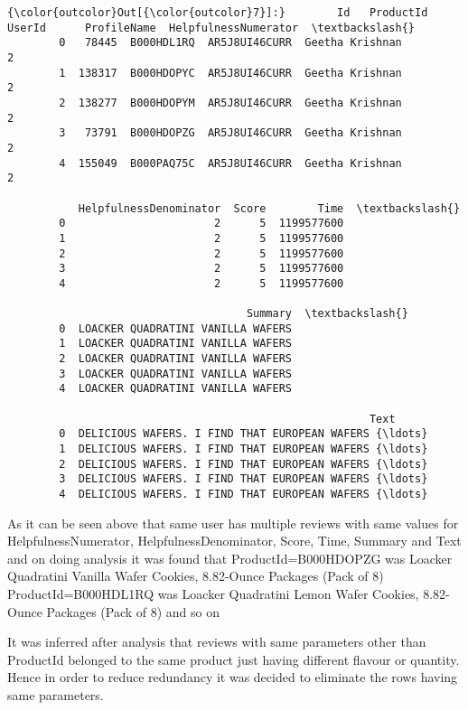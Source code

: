 \documentclass[11pt]{article}
\begin{document}
\begin{Verbatim}[commandchars=\\\{\}]
{\color{outcolor}Out[{\color{outcolor}7}]:}        Id   ProductId         UserId      ProfileName  HelpfulnessNumerator  \textbackslash{}
        0   78445  B000HDL1RQ  AR5J8UI46CURR  Geetha Krishnan                     2   
        1  138317  B000HDOPYC  AR5J8UI46CURR  Geetha Krishnan                     2   
        2  138277  B000HDOPYM  AR5J8UI46CURR  Geetha Krishnan                     2   
        3   73791  B000HDOPZG  AR5J8UI46CURR  Geetha Krishnan                     2   
        4  155049  B000PAQ75C  AR5J8UI46CURR  Geetha Krishnan                     2   
        
           HelpfulnessDenominator  Score        Time  \textbackslash{}
        0                       2      5  1199577600   
        1                       2      5  1199577600   
        2                       2      5  1199577600   
        3                       2      5  1199577600   
        4                       2      5  1199577600   
        
                                     Summary  \textbackslash{}
        0  LOACKER QUADRATINI VANILLA WAFERS   
        1  LOACKER QUADRATINI VANILLA WAFERS   
        2  LOACKER QUADRATINI VANILLA WAFERS   
        3  LOACKER QUADRATINI VANILLA WAFERS   
        4  LOACKER QUADRATINI VANILLA WAFERS   
        
                                                        Text  
        0  DELICIOUS WAFERS. I FIND THAT EUROPEAN WAFERS {\ldots}  
        1  DELICIOUS WAFERS. I FIND THAT EUROPEAN WAFERS {\ldots}  
        2  DELICIOUS WAFERS. I FIND THAT EUROPEAN WAFERS {\ldots}  
        3  DELICIOUS WAFERS. I FIND THAT EUROPEAN WAFERS {\ldots}  
        4  DELICIOUS WAFERS. I FIND THAT EUROPEAN WAFERS {\ldots}  
\end{Verbatim}
            
    As it can be seen above that same user has multiple reviews with same
values for HelpfulnessNumerator, HelpfulnessDenominator, Score, Time,
Summary and Text and on doing analysis it was found that
ProductId=B000HDOPZG was Loacker Quadratini Vanilla Wafer Cookies,
8.82-Ounce Packages (Pack of 8) ProductId=B000HDL1RQ was Loacker
Quadratini Lemon Wafer Cookies, 8.82-Ounce Packages (Pack of 8) and so
on

It was inferred after analysis that reviews with same parameters other
than ProductId belonged to the same product just having different
flavour or quantity. Hence in order to reduce redundancy it was decided
to eliminate the rows having same parameters.
\end{document}
